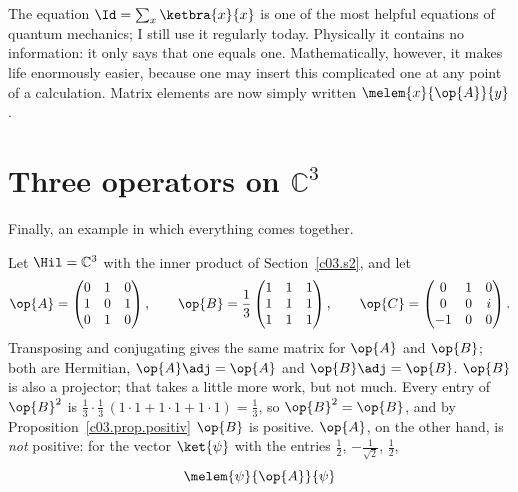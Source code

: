 The equation $\Id = \sum_x \ketbra{x}{x}$ is one of the most helpful equations of quantum
mechanics; I still use it regularly today. Physically it contains no information: it only says
that one equals one. Mathematically, however, it makes life enormously easier, because one may
insert this complicated one at any point of a calculation. Matrix elements are now simply
written $\melem{x}{\op{A}}{y}$.

\section{Three operators on $\mathbb{C}^3$}\label{c03.s12}

Finally, an example in which everything comes together.

\begin{example}\label{c03.ex.drei}
  Let $\Hil = \mathbb{C}^3$ with the inner product of Section~\ref{c03.s2}, and let
  \begin{equation}\label{c03.eq.abc}
    \op{A} = \begin{pmatrix} 0 & 1 & 0 \\ 1 & 0 & 1 \\ 0 & 1 & 0 \end{pmatrix} ,
    \qquad
    \op{B} = \frac13 \begin{pmatrix} 1 & 1 & 1 \\ 1 & 1 & 1 \\ 1 & 1 & 1 \end{pmatrix} ,
    \qquad
    \op{C} = \begin{pmatrix} 0 & 1 & 0 \\ 0 & 0 & i \\ -1 & 0 & 0 \end{pmatrix} .
  \end{equation}
  Transposing and conjugating gives the same matrix for $\op{A}$ and $\op{B}$; both are
  Hermitian, $\op{A}\adj = \op{A}$ and $\op{B}\adj = \op{B}$. $\op{B}$ is also a projector; that
  takes a little more work, but not much. Every entry of $\op{B}^2$ is
  $\tfrac13 \cdot \tfrac13 \, (1 \cdot 1 + 1 \cdot 1 + 1 \cdot 1) = \tfrac13$, so
  $\op{B}^2 = \op{B}$, and by Proposition~\ref{c03.prop.positiv} $\op{B}$ is positive.
  $\op{A}$, on the other hand, is \emph{not} positive: for the vector $\ket{\psi}$ with the
  entries $\tfrac12$, $-\tfrac{1}{\sqrt{2}}$, $\tfrac12$,
  \begin{equation}\label{c03.eq.nicht-positiv}
    \melem{\psi}{\op{A}}{\psi}

\end{equation}
\end{example}
